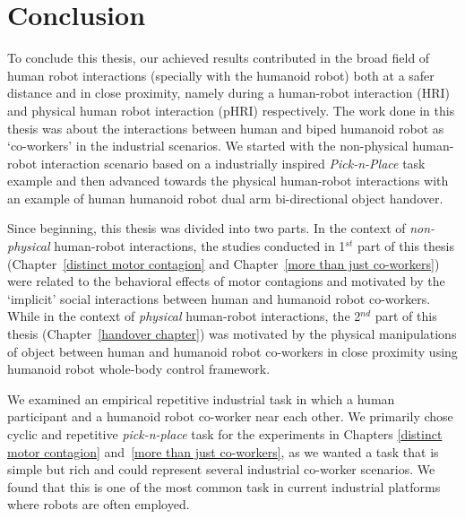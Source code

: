 
{\color{blue}\chapter*{Conclusion}}
\pagestyle{plain}

To conclude this thesis, our achieved results contributed in the broad field of human robot interactions (specially with the humanoid robot) both at a safer distance and in close proximity, namely during a human-robot interaction (HRI) and physical human robot interaction (pHRI) respectively. The work done in this thesis was about the interactions between human and biped humanoid robot as `co-workers' in the industrial scenarios. We started with the non-physical human-robot interaction scenario based on a industrially inspired \textit{Pick-n-Place} task example and then advanced towards the physical human-robot interactions with an example of human humanoid robot dual arm bi-directional object handover.

Since beginning, this thesis was divided into two parts. In the context of \textit{non-physical} human-robot interactions, the studies conducted in 1$^{st}$ part of this thesis (Chapter~\ref{distinct motor contagion} and Chapter~\ref{more than just co-workers}) were related to the behavioral effects of motor contagions and motivated by the `implicit' social interactions between human and humanoid robot co-workers. While in the context of \textit{physical} human-robot interactions, the 2$^{nd}$ part of this thesis (Chapter~\ref{handover chapter}) was motivated by the physical manipulations of object between human and humanoid robot co-workers in close proximity using humanoid robot whole-body control framework.

We examined an empirical repetitive industrial task in which a human participant and a humanoid robot co-worker near each other. We primarily chose cyclic and repetitive \textit{pick-n-place} task for the experiments in Chapters \ref{distinct motor contagion} and~\ref{more than just co-workers}, as we wanted a task that is simple but rich and could represent several industrial co-worker scenarios. We found that this is one of the most common task in current industrial platforms where robots are often employed.


